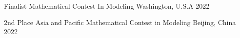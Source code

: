 



\begin{cvhonors}

  \cvhonor
    {Finalist} %
    {Mathematical Contest In Modeling} %
    {Washington, U.S.A} %
    {2022} %

  \cvhonor
    {2nd Place} %
    {Asia and Pacific Mathematical Contest in Modeling} %
    {Beijing, China} %
    {2022} %


\end{cvhonors}




